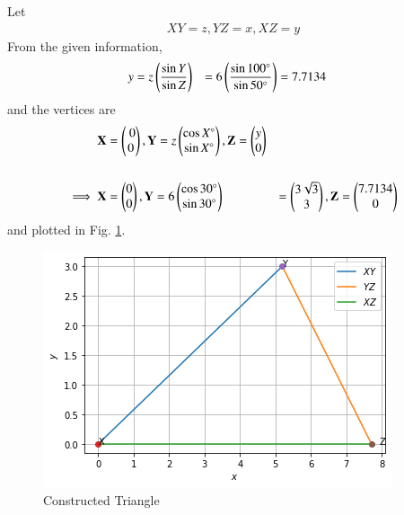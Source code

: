 Let
%
\begin{align}
 XY=z,  YZ=x,  XZ=y
\end{align}
From the given information,
%
\begin{align}
y&= z\left(\frac{\sin{Y}}{\sin{Z}}\right) 
&= 6 \left(\frac{\sin{\ang{100}}}{\sin{\ang{50}}}\right)
&= 7.7134
\end{align}
and the vertices are
\begin{align}
\mathbf{X} &= \begin{pmatrix}\ 0\\ 0\end{pmatrix}, \mathbf{Y} = z\begin{pmatrix} \cos X\si{\degree}\\ \sin X\si{\degree}\end{pmatrix} ,\mathbf{Z} =\begin{pmatrix}y \\ 0\end{pmatrix} \\
\\
\implies \mathbf{X} &=\begin{pmatrix}0 \\ 0\end{pmatrix},
\mathbf{Y} =6\begin{pmatrix}\cos{\ang{30}} \\ \sin{\ang{30}}\end{pmatrix} &= \begin{pmatrix}3\sqrt{3} \\ 3 \end{pmatrix}, 
\mathbf{Z} =\begin{pmatrix}7.7134 \\ 0\end{pmatrix}
\end{align}
and plotted in Fig. \ref{july/2/3/Figure}.
%
\begin{figure}[!b]
  \centering
            \includegraphics[width=\columnwidth]{solutions/july/2/3/Figure_1.png}
            \caption{Constructed Triangle}
            \label{july/2/3/Figure}
 \end{figure}
 

